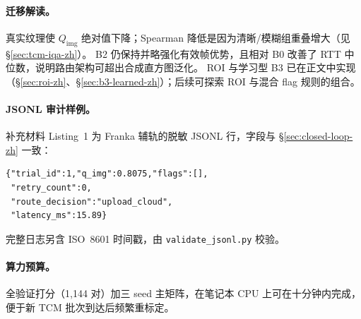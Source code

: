 \begin{table}[t]
\centering
\caption{从合成阶段 2 到 ShezhenV3 全量验证的演进。}
\label{tab:synthetic-vs-tcm-zh}
\small
{}
\end{table}

\paragraph{迁移解读。}
真实纹理使 $Q_{\mathrm{img}}$ 绝对值下降；Spearman 降低是因为清晰/模糊组重叠增大（见 \S\ref{sec:tcm-iqa-zh}）。
B2 仍保持并略强化有效帧优势，且相对 B0 改善了 RTT 中位数，说明路由架构可超出合成直方图泛化。
ROI 与学习型 B3 已在正文中实现（\S\ref{sec:roi-zh}、\S\ref{sec:b3-learned-zh}）；后续可探索 ROI 与混合 flag 规则的组合。

\paragraph{JSONL 审计样例。}
补充材料 Listing~1 为 Franka 辅轨的脱敏 JSONL 行，字段与 \S\ref{sec:closed-loop-zh} 一致：
\begin{verbatim}
{"trial_id":1,"q_img":0.8075,"flags":[],
 "retry_count":0,
 "route_decision":"upload_cloud",
 "latency_ms":15.89}
\end{verbatim}
完整日志另含 ISO~8601 时间戳，由 \texttt{validate\_jsonl.py} 校验。

\paragraph{算力预算。}
全验证打分（1{,}144 对）加三 seed 主矩阵，在笔记本 CPU 上可在十分钟内完成，便于新 TCM 批次到达后频繁重标定。
